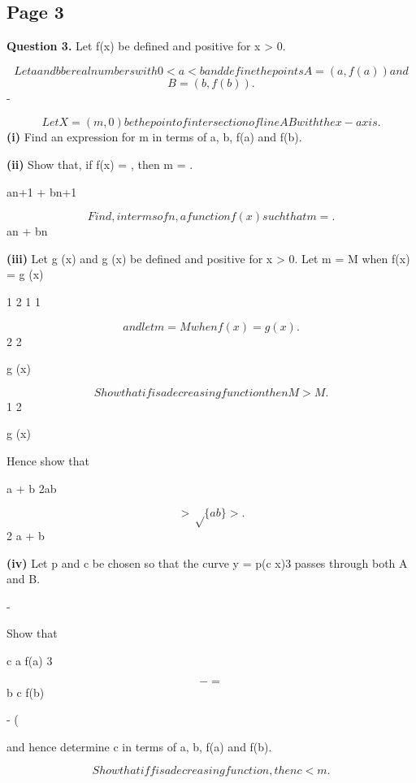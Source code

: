 \documentclass[12pt]{article}
\begin{document}
\subsection*{Page 3}
\begin{flushleft}
\bigskip\textbf{Question 3.} Let f(x) be defined and positive for x > 0.\par
\[Let a and b be real numbers with 0 < a < b and define the points A = (a, f(a)) and\]
\[B = (b, f(b)).\]
-\par
\[Let X = (m, 0) be the point of intersection of line AB with the x-axis.\]
\textbf{(i)} Find an expression for m in terms of a, b, f(a) and f(b).\par
\textbf{(ii)} Show that, if f(x) = \sqrtx, then m = \sqrtab.\par
an+1 + bn+1\par
\[Find, in terms of n, a function f(x) such that m = .\]
an + bn\par
\textbf{(iii)} Let g (x) and g (x) be defined and positive for x > 0. Let m = M when f(x) = g (x)\par
1 2 1 1\par
\[and let m = M when f(x) = g (x).\]
2 2\par
g (x)\par
\[Show that if is a decreasing function then M > M .\]
1 2\par
g (x)\par
Hence show that\par
a + b 2ab\par
\[> \sqrt\{ab\} > .\]
2 a + b\par
\textbf{(iv)} Let p and c be chosen so that the curve y = p(c x)3 passes through both A and B.\par
-\par
Show that\par
c a f(a) 3\par
\[- =\]
b c f(b)\par
-  (\par
and hence determine c in terms of a, b, f(a) and f(b).\par
\[Show that if f is a decreasing function, then c < m.\]
\end{flushleft}
\end{document}
